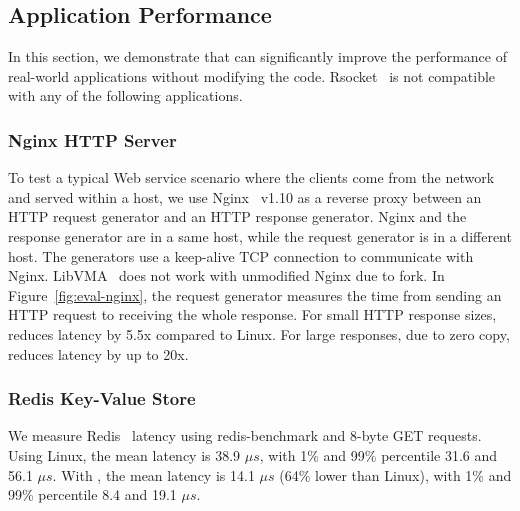 \subsection{Application Performance}
\label{subsec:application}

In this section, we demonstrate that \sys{} can significantly improve the performance of real-world applications without modifying the code.
Rsocket~\cite{rsockets} is not compatible with any of the following applications.

\subsubsection{Nginx HTTP Server}
\quad

To test a typical Web service scenario where the clients come from the network and served within a host, we use Nginx~\cite{nginx} v1.10 as a reverse proxy between an HTTP request generator and an HTTP response generator.
Nginx and the response generator are in a same host, while the request generator is in a different host.
The generators use a keep-alive TCP connection to communicate with Nginx.
LibVMA~\cite{libvma} does not work with unmodified Nginx due to fork.
In Figure~\ref{fig:eval-nginx}, the request generator measures the time from sending an HTTP request to receiving the whole response.
For small HTTP response sizes, \sys{} reduces latency by 5.5x compared to Linux.
For large responses, due to zero copy, \sys{} reduces latency by up to 20x.



\subsubsection{Redis Key-Value Store}
\quad

We measure Redis~\cite{redis} latency using redis-benchmark and 8-byte GET requests.
Using Linux, the mean latency is 38.9 $\mu s$, with 1\% and 99\% percentile 31.6 and 56.1 $\mu s$.
With \sys{}, the mean latency is 14.1 $\mu s$ (64\% lower than Linux), with 1\% and 99\% percentile 8.4 and 19.1 $\mu s$.


